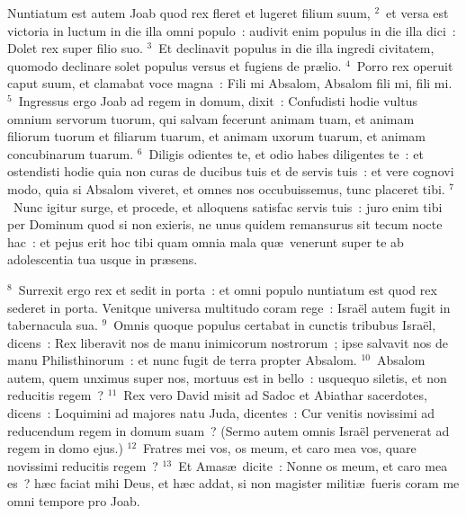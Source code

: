 \lettrine[lines=3,image=true,loversize=0.05,lraise=-0.03]{N}{}untiatum est autem Joab quod rex fleret et lugeret filium suum,
${}^{2}$~et versa est victoria in luctum in die illa omni populo~: audivit enim populus in die illa dici~: Dolet rex super filio suo.
${}^{3}$~Et declinavit populus in die illa ingredi civitatem, quomodo declinare solet populus versus et fugiens de pr\ae lio.
${}^{4}$~Porro rex operuit caput suum, et clamabat voce magna~: Fili mi Absalom, Absalom fili mi, fili mi.
${}^{5}$~Ingressus ergo Joab ad regem in domum, dixit~: Confudisti hodie vultus omnium servorum tuorum, qui salvam fecerunt animam tuam, et animam filiorum tuorum et filiarum tuarum, et animam uxorum tuarum, et animam concubinarum tuarum.
${}^{6}$~Diligis odientes te, et odio habes diligentes te~: et ostendisti hodie quia non curas de ducibus tuis et de servis tuis~: et vere cognovi modo, quia si Absalom viveret, et omnes nos occubuissemus, tunc placeret tibi.
${}^{7}$~Nunc igitur surge, et procede, et alloquens satisfac servis tuis~: juro enim tibi per Dominum quod si non exieris, ne unus quidem remansurus sit tecum nocte hac~: et pejus erit hoc tibi quam omnia mala qu\ae\ venerunt super te ab adolescentia tua usque in pr\ae sens.


${}^{8}$~Surrexit ergo rex et sedit in porta~: et omni populo nuntiatum est quod rex sederet in porta. Venitque universa multitudo coram rege~: Isra\"el autem fugit in tabernacula sua.
${}^{9}$~Omnis quoque populus certabat in cunctis tribubus Isra\"el, dicens~: Rex liberavit nos de manu inimicorum nostrorum~; ipse salvavit nos de manu Philisthinorum~: et nunc fugit de terra propter Absalom.
${}^{10}$~Absalom autem, quem unximus super nos, mortuus est in bello~: usquequo siletis, et non reducitis regem~?
${}^{11}$~Rex vero David misit ad Sadoc et Abiathar sacerdotes, dicens~: Loquimini ad majores natu Juda, dicentes~: Cur venitis novissimi ad reducendum regem in domum suam~? (Sermo autem omnis Isra\"el pervenerat ad regem in domo ejus.)
${}^{12}$~Fratres mei vos, os meum, et caro mea vos, quare novissimi reducitis regem~?
${}^{13}$~Et Amas\ae\ dicite~: Nonne os meum, et caro mea es~? h\ae c faciat mihi Deus, et h\ae c addat, si non magister militi\ae\ fueris coram me omni tempore pro Joab.


